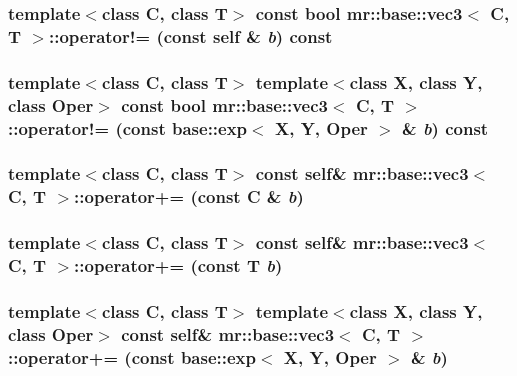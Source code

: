 \subsubsection{\setlength{\rightskip}{0pt plus 5cm}template$<$class C, class T$>$ const bool {\bf mr::base::vec3}$<$ C, T $>$::operator!= (const {\bf self} \& {\em b}) const\hspace{0.3cm}{\tt  [inline]}}\label{structmr_1_1base_1_1vec3_z38_1}


\subsubsection{\setlength{\rightskip}{0pt plus 5cm}template$<$class C, class T$>$ template$<$class X, class Y, class Oper$>$ const bool {\bf mr::base::vec3}$<$ C, T $>$::operator!= (const {\bf base::exp}$<$ X, Y, Oper $>$ \& {\em b}) const\hspace{0.3cm}{\tt  [inline]}}\label{structmr_1_1base_1_1vec3_z38_0}


\subsubsection{\setlength{\rightskip}{0pt plus 5cm}template$<$class C, class T$>$ const {\bf self}\& {\bf mr::base::vec3}$<$ C, T $>$::operator+= (const C \& {\em b})\hspace{0.3cm}{\tt  [inline]}}\label{structmr_1_1base_1_1vec3_z40_2}


\subsubsection{\setlength{\rightskip}{0pt plus 5cm}template$<$class C, class T$>$ const {\bf self}\& {\bf mr::base::vec3}$<$ C, T $>$::operator+= (const T {\em b})\hspace{0.3cm}{\tt  [inline]}}\label{structmr_1_1base_1_1vec3_z40_1}


\subsubsection{\setlength{\rightskip}{0pt plus 5cm}template$<$class C, class T$>$ template$<$class X, class Y, class Oper$>$ const {\bf self}\& {\bf mr::base::vec3}$<$ C, T $>$::operator+= (const {\bf base::exp}$<$ X, Y, Oper $>$ \& {\em b})\hspace{0.3cm}{\tt  [inline]}}\label{structmr_1_1base_1_1vec3_z40_0}


